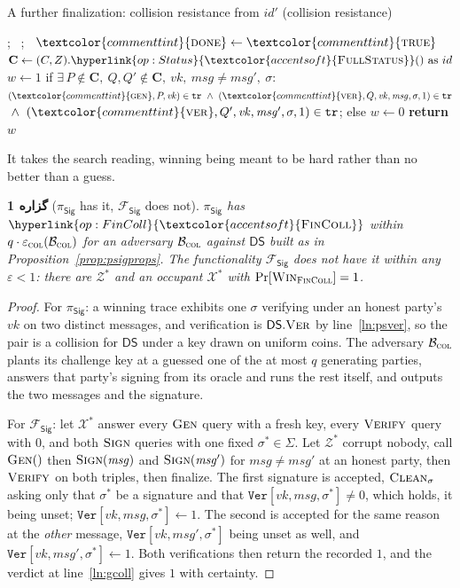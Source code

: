 \documentclass[10pt,oneside,openany]{book}
\makeatletter
\newcommand{\Cs}{\mathbf{C}}
\newcommand{\Zenv}{\mathcal{Z}}
\newcommand{\op}[1]{\textnormal{\textsc{#1}}}
\newcommand{\opdef}[1]{\hypertarget{op:#1}{\op{#1}}}
\newcommand{\opl}[1]{\hyperlink{op:#1}{\textcolor{accentsoft}{\op{#1}}}}
\newcommand{\fopl}[1]{\hyperlink{op:#1}{\textcolor{accentsoft}{\op{Full}\op{#1}}}}
\newcommand{\id}{id}
\newcommand{\atom}[1]{\textcolor{commenttint}{\op{#1}}}
\newcommand{\true}{\atom{true}}
\newcommand{\Win}{\op{Win}}
\newcommand{\done}{\atom{done}}
\newcommand{\Fsig}{\mathcal{F}_{\mathsf{Sig}}}
\newcommand{\DS}{\mathsf{DS}}
\newcommand{\psig}{\pi_{\mathsf{Sig}}}
\newcommand{\vk}{\mathit{vk}}
\newcommand{\msg}{\mathit{msg}}
\newcommand{\Sigs}{\Sigma}
\newcommand{\Clean}{\op{Clean}}
\newcommand{\V}[1]{\mathtt{#1}}
\newcounter{contline}
\newcommand{\algcont}{\setcounter{ALG@line}{\value{contline}}}
\newcommand{\algsave}{\setcounter{contline}{\value{ALG@line}}}
\newcommand{\opsig}[1]{\textcolor{accent}{\underline{\smash{#1}}}}
\theoremstyle{accentdef}
\theoremstyle{accentplain}
\newtheorem{proposition}[definition]{گزاره}
\makeatother
\begin{document}
\begin{interface}[nofloat]{A further finalization: collision resistance}
\opsig{$\id.\opdef{FinColl}()$} \quad from $\id'$ \quad (collision resistance)
\begin{algorithmic}[1]
\setcounter{contline}{0}\algcont
\Req{$\neg\done$}; \ \Req{$\id.P = Z$}; \ $\done \gets \true$
\State $\Cs \gets (C,Z).\fopl{Status}() \text{ as } \id$
\State $w \gets 1$ if $\exists\, P \notin \Cs,\ Q,Q' \notin \Cs,\ \vk,\ \msg \neq \msg',\ \sigma :$ \label{ln:gcoll}
\State \quad $(\atom{gen},P,\vk) \in \V{tr}
       \ \wedge\ (\atom{ver},Q,\vk,\msg,\sigma,1) \in \V{tr}$
\State \quad ${}\wedge\ (\atom{ver},Q',\vk,\msg',\sigma,1) \in \V{tr}$; \quad else $w \gets 0$
\State \textbf{return} $w$
\algsave
\end{algorithmic}
\end{interface}

It takes the search reading, winning being meant to be hard rather than no better than a guess.

\begin{proposition}[$\psig$ has it, $\Fsig$ does not]\label{prop:sigcoll}
$\psig$ has $\opl{FinColl}$ within $q \cdot \varepsilon_{\op{col}}(\mathcal{B}_{\op{col}})$ for an
adversary $\mathcal{B}_{\op{col}}$ against $\DS$ built as in
Proposition~\ref{prop:psigprops}. The functionality $\Fsig$ does not have it within any $\varepsilon < 1$: there
are $\Zenv^{*}$ and an occupant $\mathcal{X}^{*}$ with $\Pr[\Win_{\op{FinColl}}] = 1$.
\end{proposition}

\begin{proof}
For $\psig$: a winning trace exhibits one $\sigma$ verifying under an honest party's $\vk$ on two
distinct messages, and verification is $\DS.\op{Ver}$ by line~\ref{ln:psver}, so the pair is a
collision for $\DS$ under a key drawn on uniform coins. The adversary $\mathcal{B}_{\op{col}}$ plants its
challenge key at a guessed one of the at most $q$ generating parties, answers that party's signing
from its oracle and runs the rest itself, and outputs the two messages and the signature.

For $\Fsig$: let $\mathcal{X}^{*}$ answer every $\op{Gen}$ query with a fresh key, every
$\op{Verify}$ query with $0$, and both $\op{Sign}$ queries with one fixed $\sigma^{*} \in \Sigs$.
Let $\Zenv^{*}$ corrupt nobody, call $\op{Gen}()$ then $\op{Sign}(\msg)$ and $\op{Sign}(\msg')$
for $\msg \neq \msg'$ at an honest party, then $\op{Verify}$ on both triples, then finalize. The
first signature is accepted, $\Clean_{\sigma}$ asking only that $\sigma^{*}$ be a signature and
that $\V{Ver}[\vk,\msg,\sigma^{*}] \neq 0$, which holds, it being unset; $\V{Ver}[\vk,\msg,
\sigma^{*}] \gets 1$. The second is accepted for the same reason at the \emph{other} message,
$\V{Ver}[\vk,\msg',\sigma^{*}]$ being unset as well, and $\V{Ver}[\vk,\msg',\sigma^{*}] \gets 1$.
Both verifications then return the recorded $1$, and the verdict at line~\ref{ln:gcoll} gives $1$
with certainty.
\end{proof}
\end{document}
